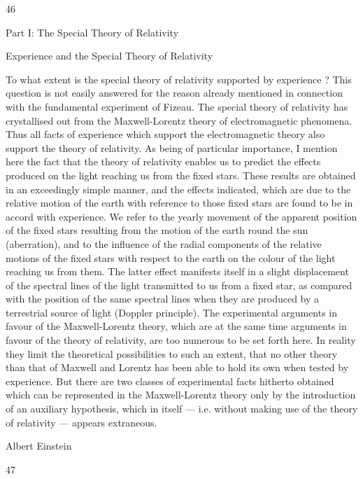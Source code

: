 \documentclass{article}
\begin{document}
46

Part I: The Special Theory of Relativity

Experience and the Special
Theory of Relativity

To what extent is the special theory of relativity supported by experience ? This question
is not easily answered for the reason already mentioned in connection with the fundamental
experiment of Fizeau. The special theory of relativity has crystallised out from the
Maxwell-Lorentz theory of electromagnetic phenomena. Thus all facts of experience which
support the electromagnetic theory also support the theory of relativity. As being of
particular importance, I mention here the fact that the theory of relativity enables us to
predict the effects produced on the light reaching us from the fixed stars. These results are
obtained in an exceedingly simple manner, and the effects indicated, which are due to the
relative motion of the earth with reference to those fixed stars are found to be in accord with
experience. We refer to the yearly movement of the apparent position of the fixed stars
resulting from the motion of the earth round the sun (aberration), and to the influence of the
radial components of the relative motions of the fixed stars with respect to the earth on the
colour of the light reaching us from them. The latter effect manifests itself in a slight
displacement of the spectral lines of the light transmitted to us from a fixed star, as
compared with the position of the same spectral lines when they are produced by a
terrestrial source of light (Doppler principle). The experimental arguments in favour of the
Maxwell-Lorentz theory, which are at the same time arguments in favour of the theory of
relativity, are too numerous to be set forth here. In reality they limit the theoretical
possibilities to such an extent, that no other theory than that of Maxwell and Lorentz has
been able to hold its own when tested by experience.
But there are two classes of experimental facts hitherto obtained which can be
represented in the Maxwell-Lorentz theory only by the introduction of an auxiliary
hypothesis, which in itself — i.e. without making use of the theory of relativity — appears
extraneous.

Albert Einstein

47
\end{document}
